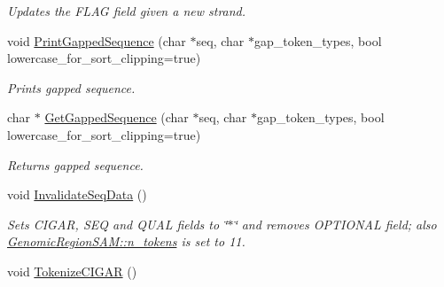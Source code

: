 \begin{CompactItemize}
\begin{CompactList}\small\item\em Updates the FLAG field given a new strand. \item\end{CompactList}\item 
\hypertarget{classGenomicRegionSAM_ea563a4a484784ad231399a3b56c7056}{
void \hyperlink{classGenomicRegionSAM_ea563a4a484784ad231399a3b56c7056}{PrintGappedSequence} (char $\ast$seq, char $\ast$gap\_\-token\_\-types, bool lowercase\_\-for\_\-sort\_\-clipping=true)}
\label{classGenomicRegionSAM_ea563a4a484784ad231399a3b56c7056}

\begin{CompactList}\small\item\em Prints gapped sequence. \item\end{CompactList}\item 
\hypertarget{classGenomicRegionSAM_9446540150b384ca0d3dbba630c9c6a6}{
char $\ast$ \hyperlink{classGenomicRegionSAM_9446540150b384ca0d3dbba630c9c6a6}{GetGappedSequence} (char $\ast$seq, char $\ast$gap\_\-token\_\-types, bool lowercase\_\-for\_\-sort\_\-clipping=true)}
\label{classGenomicRegionSAM_9446540150b384ca0d3dbba630c9c6a6}

\begin{CompactList}\small\item\em Returns gapped sequence. \item\end{CompactList}\item 
\hypertarget{classGenomicRegionSAM_621b3dd6f4d03a5223bd26a57af14f7e}{
void \hyperlink{classGenomicRegionSAM_621b3dd6f4d03a5223bd26a57af14f7e}{InvalidateSeqData} ()}
\label{classGenomicRegionSAM_621b3dd6f4d03a5223bd26a57af14f7e}

\begin{CompactList}\small\item\em Sets CIGAR, SEQ and QUAL fields to \char`\"{}$\ast$\char`\"{} and removes OPTIONAL field; also \hyperlink{classGenomicRegionSAM_281e35ef1bd0b7da811d9b8957f3d08f}{GenomicRegionSAM::n\_\-tokens} is set to 11. \item\end{CompactList}\item 
\hypertarget{classGenomicRegionSAM_34b0387b9656e48d0c4046d62fe085e1}{
void \hyperlink{classGenomicRegionSAM_34b0387b9656e48d0c4046d62fe085e1}{TokenizeCIGAR} ()}
\label{classGenomicRegionSAM_34b0387b9656e48d0c4046d62fe085e1}


\end{CompactItemize}
